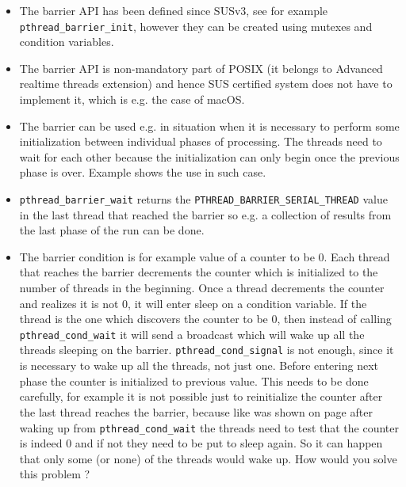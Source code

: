 \begin{itemize}
\item The barrier API has been defined since SUSv3, see for example
\texttt{pthread\_\-barrier\_init}, however they can be created using
mutexes and condition variables.
\item The barrier API is non-mandatory part of POSIX (it belongs to
Advanced realtime threads extension) and hence SUS certified system does not
have to implement it, which is e.g. the case of macOS.
\item The barrier can be used e.g. in situation when it is necessary to perform
some initialization between individual phases of processing. The threads
need to wait for each other because the initialization can only begin
once the previous phase is over.
Example  shows the use in such case.
\item \texttt{pthread\_barrier\_wait} returns
the \texttt{PTHREAD\_BARRIER\_SERIAL\_THREAD} value
in the last thread that reached the barrier so e.g. a collection of
results from the last phase of the run can be done.
\item The barrier condition is for example value of a counter to be 0.
Each thread that reaches the barrier decrements the counter which is
initialized to the number of threads in the beginning.
Once a thread decrements the counter and realizes it is not 0,
it will enter sleep on a condition variable.
If the thread is the one which discovers the counter to be 0, then instead of
calling \texttt{pthread\_cond\_wait} it will send a broadcast which will
wake up all the threads sleeping on the barrier.
\texttt{pthread\_cond\_signal} is not enough, since it is necessary to wake up
all the threads, not just one.
Before entering next phase the counter is initialized to previous value.
This needs to be done carefully, for example it is not possible just to
reinitialize the counter after the last thread reaches the barrier,
because like was shown on page \pageref{CONDITION_VARIABLES} after waking
up from \texttt{pthread\_cond\_wait} the threads need to test that the counter
is indeed 0 and if not they need to be put to sleep again. So it can happen
that only some (or none) of the threads would wake up.
How would you solve this problem ?
\end{itemize}




